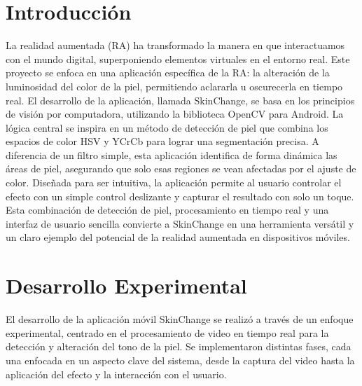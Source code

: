 \documentclass[conference]{IEEEtran}
\begin{document}

\section{Introducción}
La realidad aumentada (RA) ha transformado la manera en que interactuamos con el mundo digital, superponiendo elementos virtuales en el entorno real. Este proyecto se enfoca en una aplicación específica de la RA: la alteración de la luminosidad del color de la piel, permitiendo aclararla u oscurecerla en tiempo real\cite{c2}.
El desarrollo de la aplicación, llamada SkinChange, se basa en los principios de visión por computadora, utilizando la biblioteca OpenCV para Android. La lógica central se inspira en un método de detección de piel que combina los espacios de color HSV y YCrCb para lograr una segmentación precisa. A diferencia de un filtro simple, esta aplicación identifica de forma dinámica las áreas de piel, asegurando que solo esas regiones se vean afectadas por el ajuste de color.
Diseñada para ser intuitiva, la aplicación permite al usuario controlar el efecto con un simple control deslizante y capturar el resultado con solo un toque. Esta combinación de detección de piel, procesamiento en tiempo real y una interfaz de usuario sencilla convierte a SkinChange en una herramienta versátil y un claro ejemplo del potencial de la realidad aumentada en dispositivos móviles\cite{c3}.

\section{Desarrollo Experimental}
El desarrollo de la aplicación móvil SkinChange se realizó a través de un enfoque experimental, centrado en el procesamiento de video en tiempo real para la detección y alteración del tono de la piel. Se implementaron distintas fases, cada una enfocada en un aspecto clave del sistema, desde la captura del video hasta la aplicación del efecto y la interacción con el usuario\cite{c4}.
\end{document}
